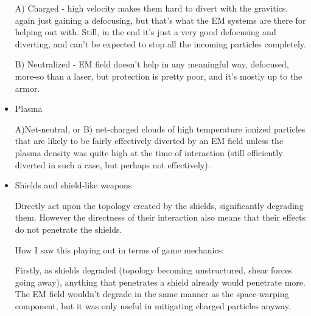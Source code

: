\begin{itemize}
A) Charged - high velocity makes them hard to divert with the
gravitics, again just gaining a defocusing, but that's what the EM
systems are there for helping out with. Still, in the end it's just a
very good defocusing and diverting, and can't be expected to stop all
the incoming particles completely.

B) Neutralized - EM field doesn't help in any meaningful way,
defocused, more-so than a laser, but protection is pretty poor, and
it's mostly up to the armor.

\item Plasma 

A)Net-neutral, or B) net-charged clouds of high temperature ionized
particles that are likely to be fairly effectively diverted by an EM
field unless the plasma density was quite high at the time of
interaction (still efficiently diverted in such a case, but perhaps
not effectively).

\item Shields and shield-like weapons

Directly act upon the topology created by the shields, significantly
degrading them. However the directness of their interaction also means
that their effects do not penetrate the shields.

How I saw this playing out in terms of game mechanics: 

Firstly, as shields degraded (topology becoming unstructured, shear
forces going away), anything that penetrates a shield already would
penetrate more. The EM field wouldn't degrade in the same manner as
the space-warping component, but it was only useful in mitigating
charged particles anyway.

\end{itemize}

